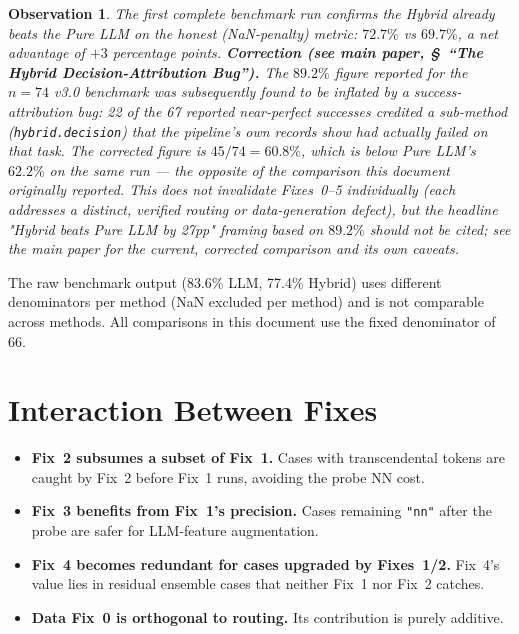 \documentclass[twoside,11pt]{article}
\newtheorem{observation}{Observation}
\begin{document}
\begin{observation}
The first complete benchmark run confirms the Hybrid already
\emph{beats} the Pure LLM on the honest (NaN-penalty) metric:
$72.7\%$ vs $69.7\%$, a net advantage of $+3$ percentage points.
\textbf{Correction (see main paper, \S~``The Hybrid Decision-Attribution
Bug'').} The $89.2\%$ figure reported for the $n=74$ v3.0 benchmark was
subsequently found to be inflated by a success-attribution bug: 22 of the
67 reported near-perfect successes credited a sub-method
(\texttt{hybrid.decision}) that the pipeline's own records show had
actually failed on that task. The corrected figure is $45/74 = 60.8\%$,
which is \emph{below} Pure LLM's $62.2\%$ on the same run --- the opposite
of the comparison this document originally reported. This does not
invalidate Fixes~0--5 individually (each addresses a distinct, verified
routing or data-generation defect), but the headline "Hybrid beats Pure
LLM by 27pp" framing based on $89.2\%$ should not be cited; see the main
paper for the current, corrected comparison and its own caveats.
\end{observation}

\begin{remark}
The raw benchmark output (83.6\% LLM, 77.4\% Hybrid) uses different
denominators per method (NaN excluded per method) and is not comparable
across methods.  All comparisons in this document use the fixed denominator
of 66.
\end{remark}

\section{Interaction Between Fixes}
\label{sec:interactions}

\begin{itemize}[leftmargin=*]
  \item \textbf{Fix~2 subsumes a subset of Fix~1.}  Cases with transcendental
    tokens are caught by Fix~2 before Fix~1 runs, avoiding the probe NN cost.
  \item \textbf{Fix~3 benefits from Fix~1's precision.}  Cases remaining
    \texttt{"nn"} after the probe are safer for LLM-feature augmentation.
  \item \textbf{Fix~4 becomes redundant for cases upgraded by Fixes~1/2.}
    Fix~4's value lies in residual ensemble cases that neither Fix~1 nor
    Fix~2 catches.
  \item \textbf{Data Fix~0 is orthogonal to routing.}  Its contribution
    is purely additive.
\end{itemize}
\end{document}
